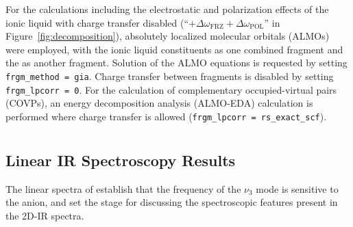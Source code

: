 \documentclass[%
  class = book,%
  crop = false,%
  float = true,%
  multi = true,%
  preview = false,%
]{standalone}
\begin{document}
{For the calculations including the electrostatic and polarization effects of the ionic liquid with charge transfer disabled (``\(+ \Delta \omega_\mathrm{FRZ} + \Delta \omega_\mathrm{POL}\)'' in Figure~\ref{fig:decomposition}), absolutely localized molecular orbitals (ALMOs)\cite{Khaliullin2006} were employed, with the ionic liquid constituents as one combined fragment and the  as another fragment. Solution of the ALMO equations is requested by setting \verb!frgm_method = gia!. Charge transfer between fragments is disabled by setting \verb!frgm_lpcorr = 0!. For the calculation of complementary occupied-virtual pairs (COVPs), an energy decomposition analysis (ALMO-EDA) calculation is performed where charge transfer is allowed (\verb!frgm_lpcorr = rs_exact_scf!).

\section{\texorpdfstring{}{Results and Discussion}}

\subsection{Linear IR Spectroscopy Results}
\label{sec:anions_linear}

The linear spectra of  establish that the frequency of the \(\nu_3\) mode is sensitive to the anion, and set the stage for discussing the spectroscopic features present in the 2D-IR spectra.

}
\end{document}
